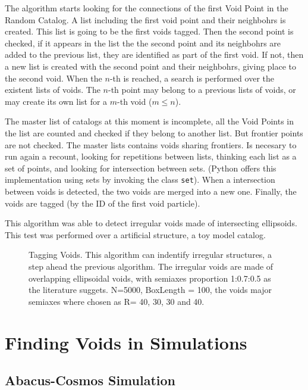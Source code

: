 \documentclass[preprint]{aastex62}
\begin{document}
The algorithm starts looking for the connections of the first Void Point in the
Random Catalog. A list including the first void point and their neighbohrs is
created. This list is going to be the first voids tagged. Then the second point
is checked, if it appears in the list the the second point and its neighbohrs
are added to the previous list, they are identified as part of the first void.
If not, then a new list is created with the second point and their neighbohrs,
giving place to the second void. When the $n$-th  is reached, a search is
performed over the existent lists of voids. The $n$-th point may belong to
a previous lists of voids, or may create its own list for a $m$-th void
($ m \leq n$). 

The master list of catalogs at this moment is incomplete, all the Void Points
in the list are counted and checked if they belong to another list. But frontier
points are not checked. The master lists contains voids sharing frontiers.
Is necesary to run again a recount, looking for repetitions between lists,
thinking each list as a set of points,
and looking for intersection between sets. (Python offers this implementation
using sets by invoking the class \texttt{set}). When a intersection between voids
is detected, the two voids are merged into a new one. Finally, the voids are
tagged (by the ID of the first void particle).


This algorithm was able to detect irregular voids made of intersecting
ellipsoids. This test was performed over a artificial structure, a toy model catalog.


\begin{figure}
  \caption{Tagging Voids. This algorithm can indentify irregular structures,
    a step ahead the previous algorithm. The irregular voids are made of
    overlapping ellipsoidal voids, with semiaxes proportion 1:0.7:0.5 as the 
    literature suggets.  
    N=5000, BoxLength = 100, the voids major semiaxes where chosen as
    R= 40, 30, 30 and 40.
    \label{fig:Tagging Toy Model Voids}}
\end{figure}


\section{Finding Voids in Simulations}

\subsection{Abacus-Cosmos Simulation}
\end{document}

